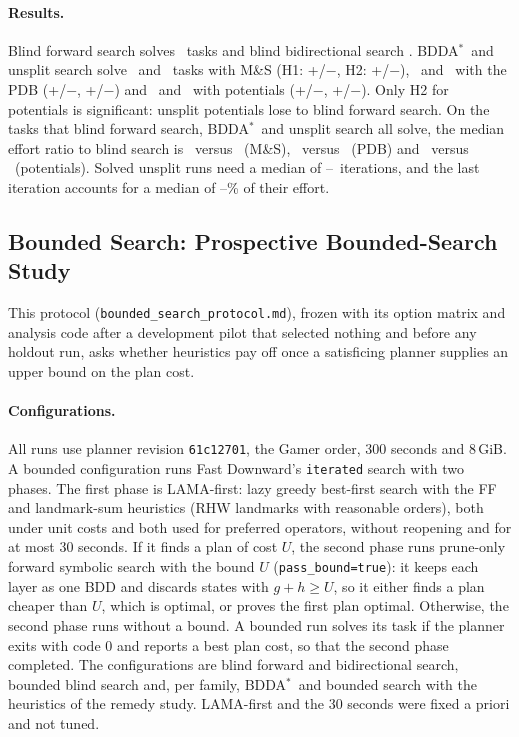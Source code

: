 \documentclass[letterpaper]{article}
\newcommand{\bddastar}{BDDA\ensuremath{^{*}}}
\theoremstyle{plain}
\theoremstyle{definition}
\theoremstyle{remark}
\begin{document}
\paragraph{Results.}
Blind forward search solves \UbSolvedBlindFw\ tasks and blind bidirectional
search \UbSolvedBlindBd.  \bddastar\ and unsplit search solve
\UbSolvedMsPlain\ and \UbSolvedMsUnsplit\ tasks with M\&S
(H1: +\UbMsVsPlainGains/$-$\UbMsVsPlainLosses, H2:
+\UbMsVsBlindGains/$-$\UbMsVsBlindLosses), \UbSolvedPdbPlain\ and
\UbSolvedPdbUnsplit\ with the PDB (+\UbPdbVsPlainGains/$-$\UbPdbVsPlainLosses,
+\UbPdbVsBlindGains/$-$\UbPdbVsBlindLosses) and \UbSolvedPotPlain\ and
\UbSolvedPotUnsplit\ with potentials
(+\UbPotVsPlainGains/$-$\UbPotVsPlainLosses,
+\UbPotVsBlindGains/$-$\UbPotVsBlindLosses).  Only H2 for potentials is
significant: unsplit potentials lose to blind forward search.  On the tasks
that blind forward search, \bddastar\ and unsplit search all solve, the
median effort ratio to blind search is \UbMsEffortPlain\ versus
\UbMsEffortUnsplit\ (M\&S), \UbPdbEffortPlain\ versus \UbPdbEffortUnsplit\
(PDB) and \UbPotEffortPlain\ versus \UbPotEffortUnsplit\ (potentials).
Solved unsplit runs need a median of \UbIterationsMin--\UbIterationsMax\
iterations, and the last iteration accounts for a median of
\UbMinLastShare--\UbMaxLastShare\% of their effort.

\subsection{Bounded Search: Prospective Bounded-Search Study}
\label{sec:supp-bounded}

This protocol (\texttt{bounded\_\allowbreak search\_\allowbreak protocol.md}), frozen with its option
matrix and analysis code after a development pilot that selected nothing and
before any holdout run, asks whether heuristics pay off once a satisficing
planner supplies an upper bound on the plan cost.

\paragraph{Configurations.}
All runs use planner revision \texttt{61c12701}, the Gamer order, 300 seconds
and 8\,GiB.  A bounded configuration runs Fast Downward's \texttt{iterated}
search with two phases.  The first phase is LAMA-first: lazy greedy
best-first search with the FF and landmark-sum heuristics (RHW landmarks with
reasonable orders), both under unit costs and both used for preferred
operators, without reopening and for at most 30 seconds.  If it finds a plan
of cost $U$, the second phase runs prune-only forward symbolic search with
the bound $U$ (\texttt{pass\_bound=true}): it keeps each layer as one BDD and
discards states with $g+h\geq U$, so it either finds a plan cheaper than $U$,
which is optimal, or proves the first plan optimal.  Otherwise, the second
phase runs without a bound.  A bounded run solves its task if the planner
exits with code 0 and reports a best plan cost, so that the second phase
completed.  The configurations are blind forward and bidirectional search,
bounded blind search and, per family, \bddastar\ and bounded search with the
heuristics of the remedy study.  LAMA-first and the 30 seconds were fixed a
priori and not tuned.
\end{document}
